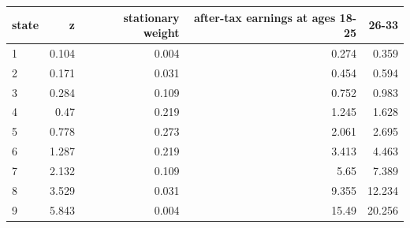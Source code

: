 \begin{tabular}{lrrrr}
\toprule
state & z & stationary weight & after-tax earnings at ages 18-25 & 26-33 \\
\midrule
1 & 0.104 & 0.004 & 0.274 & 0.359 \\
2 & 0.171 & 0.031 & 0.454 & 0.594 \\
3 & 0.284 & 0.109 & 0.752 & 0.983 \\
4 & 0.47 & 0.219 & 1.245 & 1.628 \\
5 & 0.778 & 0.273 & 2.061 & 2.695 \\
6 & 1.287 & 0.219 & 3.413 & 4.463 \\
7 & 2.132 & 0.109 & 5.65 & 7.389 \\
8 & 3.529 & 0.031 & 9.355 & 12.234 \\
9 & 5.843 & 0.004 & 15.49 & 20.256 \\
\bottomrule
\end{tabular}
